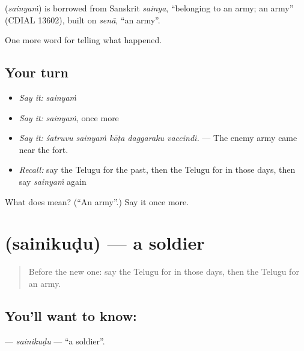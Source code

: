 \begin{cousinweb}
\textbf{} (\emph{sainyaṁ}) is borrowed from Sanskrit \emph{sainya}, \textquotedblleft{}belonging to an army; an army\textquotedblright{} (CDIAL 13602), built on \emph{senā}, \textquotedblleft{}an army\textquotedblright{}.
\end{cousinweb}

\begin{grammarlens}[title={What you've built}]
One more word for telling what happened.
\end{grammarlens}

\subsection*{Your turn}
\begin{itemize}
\raggedright
  \item \emph{Say it:} \emph{sainyaṁ}
  \item \emph{Say it:} \emph{sainyaṁ}, once more
  \item \emph{Say it:} \emph{śatruvu sainyaṁ kōṭa daggaraku vaccindi.} — The enemy army came near the fort.
  \item \emph{Recall:} say the Telugu for the past, then the Telugu for in those days, then say \emph{sainyaṁ} again
\end{itemize}

\begin{tcolorbox}[breakable,colback=teal!4,colframe=teal!35!black,title={Before you move on}]
What does  mean? (\textquotedblleft{}An army\textquotedblright{}.) Say it once more.
\end{tcolorbox}
\section[\texorpdfstring{\te{సైనికుడు} (sainikuḍu)}{సైనికుడు (sainikuḍu)}]{ (sainikuḍu) — a soldier}

\label{lesson:TE-C339-sainikudu}



\begin{quote}
Before the new one: say the Telugu for in those days, then the Telugu for an army.
\end{quote}

\subsection*{You'll want to know: }
\textbf{} — \emph{sainikuḍu} — \textquotedblleft{}a soldier\textquotedblright{}.


